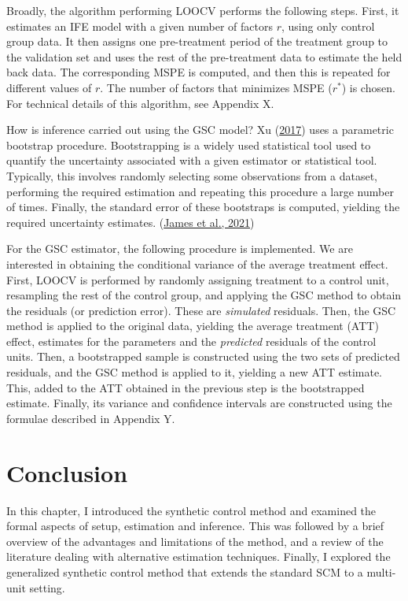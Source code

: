 \documentclass[12pt,nobind, a4paper]{reedthesis}
\begin{document}
 Broadly, the algorithm performing LOOCV performs the following steps. First, it estimates an IFE model with a given number of factors \(r\), using only control group data. It then assigns one pre-treatment period of the treatment group to the validation set and uses the rest of the pre-treatment data to estimate the held back data. The corresponding MSPE is computed, and then this is repeated for different values of \(r\). The number of factors that minimizes MSPE (\(r^{*}\)) is chosen. For technical details of this algorithm, see Appendix X.
 \linebreak

 How is inference carried out using the GSC model? Xu (\protect\hyperlink{ref-xu_generalized_2017}{2017}) uses a parametric bootstrap procedure. Bootstrapping is a widely used statistical tool used to quantify the uncertainty associated with a given estimator or statistical tool. Typically, this involves randomly selecting some observations from a dataset, performing the required estimation and repeating this procedure a large number of times. Finally, the standard error of these bootstraps is computed, yielding the required uncertainty estimates. (\protect\hyperlink{ref-james_introduction_2021}{James et al., 2021})
 \linebreak

 For the GSC estimator, the following procedure is implemented. We are interested in obtaining the conditional variance of the average treatment effect. First, LOOCV is performed by randomly assigning treatment to a control unit, resampling the rest of the control group, and applying the GSC method to obtain the residuals (or prediction error). These are \textit{simulated} residuals. Then, the GSC method is applied to the original data, yielding the average treatment (ATT) effect, estimates for the parameters and the \textit{predicted} residuals of the control units. Then, a bootstrapped sample is constructed using the two sets of predicted residuals, and the GSC method is applied to it, yielding a new ATT estimate. This, added to the ATT obtained in the previous step is the bootstrapped estimate. Finally, its variance and confidence intervals are constructed using the formulae described in Appendix Y.

 \hypertarget{conclusion-1}{%
 \section{Conclusion}\label{conclusion-1}}

 In this chapter, I introduced the synthetic control method and examined the formal aspects of setup, estimation and inference. This was followed by a brief overview of the advantages and limitations of the method, and a review of the literature dealing with alternative estimation techniques. Finally, I explored the generalized synthetic control method that extends the standard SCM to a multi-unit setting.
 \linebreak
\end{document}
